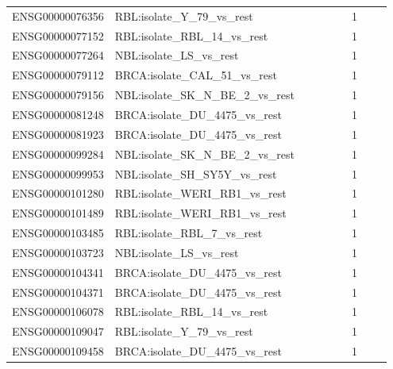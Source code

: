 \begin{landscape}
{\begin{longtable}{p{0.18\linewidth}p{0.65\linewidth}p{0.12\linewidth}}
ENSG00000076356 & RBL:isolate\_\allowbreak{}Y\_\allowbreak{}79\_\allowbreak{}vs\_\allowbreak{}rest & 1 \\
ENSG00000077152 & RBL:isolate\_\allowbreak{}RBL\_\allowbreak{}14\_\allowbreak{}vs\_\allowbreak{}rest & 1 \\
ENSG00000077264 & NBL:isolate\_\allowbreak{}LS\_\allowbreak{}vs\_\allowbreak{}rest & 1 \\
ENSG00000079112 & BRCA:isolate\_\allowbreak{}CAL\_\allowbreak{}51\_\allowbreak{}vs\_\allowbreak{}rest & 1 \\
ENSG00000079156 & NBL:isolate\_\allowbreak{}SK\_\allowbreak{}N\_\allowbreak{}BE\_\allowbreak{}2\_\allowbreak{}vs\_\allowbreak{}rest & 1 \\
ENSG00000081248 & BRCA:isolate\_\allowbreak{}DU\_\allowbreak{}4475\_\allowbreak{}vs\_\allowbreak{}rest & 1 \\
ENSG00000081923 & BRCA:isolate\_\allowbreak{}DU\_\allowbreak{}4475\_\allowbreak{}vs\_\allowbreak{}rest & 1 \\
ENSG00000099284 & NBL:isolate\_\allowbreak{}SK\_\allowbreak{}N\_\allowbreak{}BE\_\allowbreak{}2\_\allowbreak{}vs\_\allowbreak{}rest & 1 \\
ENSG00000099953 & NBL:isolate\_\allowbreak{}SH\_\allowbreak{}SY5Y\_\allowbreak{}vs\_\allowbreak{}rest & 1 \\
ENSG00000101280 & RBL:isolate\_\allowbreak{}WERI\_\allowbreak{}RB1\_\allowbreak{}vs\_\allowbreak{}rest & 1 \\
ENSG00000101489 & RBL:isolate\_\allowbreak{}WERI\_\allowbreak{}RB1\_\allowbreak{}vs\_\allowbreak{}rest & 1 \\
ENSG00000103485 & RBL:isolate\_\allowbreak{}RBL\_\allowbreak{}7\_\allowbreak{}vs\_\allowbreak{}rest & 1 \\
ENSG00000103723 & NBL:isolate\_\allowbreak{}LS\_\allowbreak{}vs\_\allowbreak{}rest & 1 \\
ENSG00000104341 & BRCA:isolate\_\allowbreak{}DU\_\allowbreak{}4475\_\allowbreak{}vs\_\allowbreak{}rest & 1 \\
ENSG00000104371 & BRCA:isolate\_\allowbreak{}DU\_\allowbreak{}4475\_\allowbreak{}vs\_\allowbreak{}rest & 1 \\
ENSG00000106078 & RBL:isolate\_\allowbreak{}RBL\_\allowbreak{}14\_\allowbreak{}vs\_\allowbreak{}rest & 1 \\
ENSG00000109047 & RBL:isolate\_\allowbreak{}Y\_\allowbreak{}79\_\allowbreak{}vs\_\allowbreak{}rest & 1 \\
ENSG00000109458 & BRCA:isolate\_\allowbreak{}DU\_\allowbreak{}4475\_\allowbreak{}vs\_\allowbreak{}rest & 1 \\

\end{longtable}}
\end{landscape}
